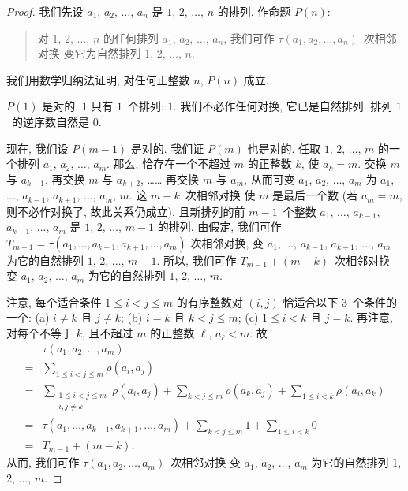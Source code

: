 \documentclass[../libro.tex]{subfiles}
\begin{document}
\begin{proof}
    我们先设 \(a_1\), \(a_2\), \(\dots\), \(a_n\)
    是 \(1\), \(2\), \(\dots\), \(n\) 的排列.
    作命题 \(P(n)\):
    \begin{quotation}
        对 \(1\), \(2\), \(\dots\), \(n\)
        的任何排列 \(a_1\), \(a_2\), \(\dots\), \(a_n\),
        我们可作 \(\tau (a_1, a_2, \dots, a_n)\)~次相邻对换%
        变它为自然排列 \(1\), \(2\), \(\dots\), \(n\).
    \end{quotation}
    我们用数学归纳法证明,
    对任何正整数 \(n\), \(P(n)\) 成立.

    \(P(1)\) 是对的.
    \(1\) 只有 \(1\)~个排列: \(1\).
    我们不必作任何对换, 它已是自然排列.
    排列 \(1\)~的逆序数自然是 \(0\).

    现在, 我们设 \(P(m-1)\) 是对的.
    我们证 \(P(m)\) 也是对的.
    任取 \(1\), \(2\), \(\dots\), \(m\) 的一个排列
    \(a_1\), \(a_2\), \(\dots\), \(a_m\).
    那么, 恰存在一个不超过 \(m\) 的正整数 \(k\),
    使 \(a_k = m\).
    交换 \(m\) 与 \(a_{k+1}\),
    再交换 \(m\) 与 \(a_{k+2}\),
    ……
    再交换 \(m\) 与 \(a_m\),
    从而可变 \(a_1\), \(a_2\), \(\dots\), \(a_m\)
    为 \(a_1\), \(\dots\), \(a_{k-1}\),
    \(a_{k+1}\), \(\dots\), \(a_m\), \(m\).
    这 \(m - k\)~次相邻对换%
    使 \(m\) 是最后一个数
    (若 \(a_m = m\), 则不必作对换了,
    故此关系仍成立),
    且新排列的前 \(m-1\)~个整数
    \(a_1\), \(\dots\), \(a_{k-1}\),
    \(a_{k+1}\), \(\dots\), \(a_m\)
    是 \(1\), \(2\), \(\dots\), \(m-1\) 的排列.
    由假定, 我们可作
    \(
        T_{m-1} = \tau (a_1, \dots, a_{k-1}, a_{k+1}, \dots, a_m)
    \)
    次相邻对换,
    变 \(a_1\), \(\dots\), \(a_{k-1}\),
    \(a_{k+1}\), \(\dots\), \(a_m\)
    为它的自然排列 \(1\), \(2\), \(\dots\), \(m-1\).
    所以, 我们可作 \(T_{m-1} + (m - k)\)~次相邻对换%
    变 \(a_1\), \(a_2\), \(\dots\), \(a_m\)
    为它的自然排列 \(1\), \(2\), \(\dots\), \(m\).

    注意, 每个适合条件 \(1 \leq i < j \leq m\)
    的有序整数对 \((i, j)\)
    恰适合以下 \(3\)~个条件的一个:
    (a)
    \(i \neq k\) 且 \(j \neq k\);
    (b)
    \(i = k\) 且 \(k < j \leq m\);
    (c)
    \(1 \leq i < k\) 且 \(j = k\).
    再注意, 对每个不等于 \(k\),
    且不超过 \(m\) 的正整数 \(\ell\),
    \(a_\ell < m\).
    故
    \begin{align*}
        & \tau (a_1, a_2, \dots, a_m)
        \\
        = {} &
        \sum_{1 \leq i < j \leq m} {\rho(a_i, a_j)}
        \\
        = {} &
        \sum_{\substack{1 \leq i < j \leq m \\ i,j \neq k}}
        {\rho(a_i, a_j)}
        + \sum_{k < j \leq m} {\rho(a_k, a_j)}
        + \sum_{1 \leq i < k} {\rho(a_i, a_k)}
        \\
        = {} &
        \tau (a_1, \dots, a_{k-1}, a_{k+1}, \dots, a_m)
        + \sum_{k < j \leq m} {1}
        + \sum_{1 \leq i < k} {0}
        \\
        = {} &
        T_{m-1} + (m - k).
    \end{align*}
    从而, 我们可作
    \(\tau (a_1, a_2, \dots, a_m)\)~次相邻对换%
    变 \(a_1\), \(a_2\), \(\dots\), \(a_m\)
    为它的自然排列 \(1\), \(2\), \(\dots\), \(m\).


\end{proof}
\end{document}
